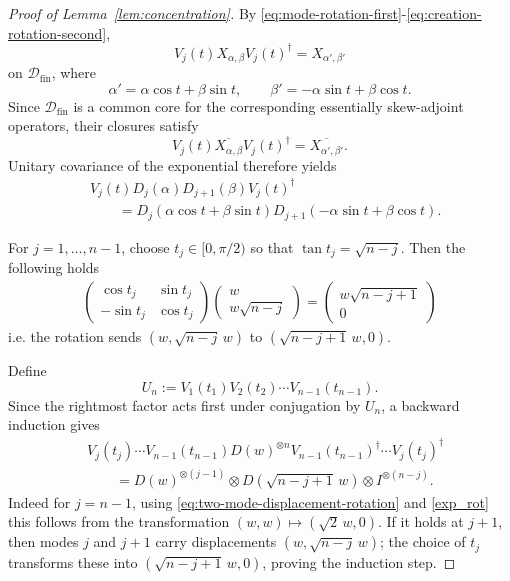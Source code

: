 \documentclass{article}
\theoremstyle{named}
\theoremstyle{named1}
\theoremstyle{plain}
\theoremstyle{remark}
\begin{document}
\begin{proof}[Proof of Lemma~\ref{lem:concentration}]
By
\eqref{eq:mode-rotation-first}-\eqref{eq:creation-rotation-second},
\[
    V_j(t)X_{\alpha,\beta}V_j(t)^\dagger
    =
    X_{\alpha',\beta'}
\]
on $\mathscr D_{\mathrm{fin}}$, where
\[
    \alpha'
    =
    \alpha\cos t+\beta\sin t,
    \qquad
    \beta'
    =
    -\alpha\sin t+\beta\cos t.
\]
Since $\mathscr D_{\mathrm{fin}}$ is a common core for the corresponding
essentially skew-adjoint operators, their closures satisfy
\[
    V_j(t)\overline{X_{\alpha,\beta}}V_j(t)^\dagger
    =
    \overline{X_{\alpha',\beta'}}.
\]
Unitary covariance of the exponential therefore yields
\begin{equation}
\begin{aligned}
&
V_j(t)
D_j(\alpha)D_{j+1}(\beta)
V_j(t)^\dagger
\\
&\qquad=
D_j(\alpha\cos t+\beta\sin t)
D_{j+1}(-\alpha\sin t+\beta\cos t).
\end{aligned}
\label{eq:two-mode-displacement-rotation}
\end{equation}

For $j=1,\ldots,n-1$, choose $t_j\in[0,\pi/2)$ so that
$\tan t_j=\sqrt{n-j}.
    $
Then the following holds 
\begin{align}
    \begin{pmatrix}
        \cos t_j& \sin t_j\\
        -\sin t_j& \cos t_j
    \end{pmatrix}\begin{pmatrix}
        w\\
        w\sqrt{n-j} 
    \end{pmatrix}= \begin{pmatrix}
        w \sqrt{n-j+1} \\
        0 
    \end{pmatrix} \label{exp_rot}
\end{align}
i.e. the rotation sends
$\left(
        w,\sqrt{n-j}\,w
    \right)
$
to
$\left(
        \sqrt{n-j+1}\,w,0
    \right).
$

Define
\begin{equation}
    U_n
    :=
    V_1(t_1)V_2(t_2)\cdots V_{n-1}(t_{n-1}).
    \label{eq:concentration-unitary}
\end{equation}
Since the rightmost factor acts first under conjugation by $U_n$, a
backward induction gives
\begin{align}
&
V_j(t_j)\cdots V_{n-1}(t_{n-1})
D(w)^{\otimes n}
V_{n-1}(t_{n-1})^\dagger\cdots V_j(t_j)^\dagger
\nonumber\\
&\qquad=
D(w)^{\otimes(j-1)}
\otimes
D\!\left(
    \sqrt{n-j+1}\,w
\right)
\otimes
I^{\otimes(n-j)}.
\label{eq:partial-concentration}
\end{align}
Indeed for $j=n-1$, using \eqref{eq:two-mode-displacement-rotation} and \eqref{exp_rot} this follows from the transformation
$(w,w)\mapsto(\sqrt2\,w,0)$.  If it holds at $j+1$, then modes $j$
and $j+1$ carry displacements
$(w,\sqrt{n-j}\,w)$; the choice of $t_j$ transforms these into
$(\sqrt{n-j+1}\,w,0)$, proving the induction step.


\end{proof}
\end{document}

